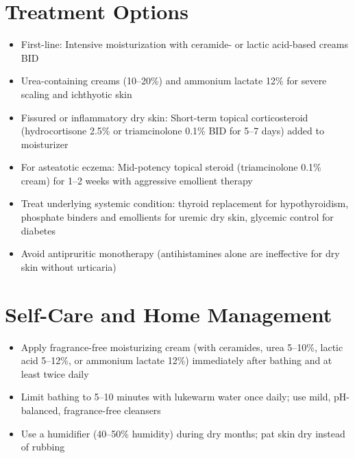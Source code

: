 \section*{Treatment Options}
\begin{itemize}
  \item First-line: Intensive moisturization with ceramide- or lactic acid-based creams BID
  \item Urea-containing creams (10--20\%) and ammonium lactate 12\% for severe scaling and ichthyotic skin
  \item Fissured or inflammatory dry skin: Short-term topical corticosteroid (hydrocortisone 2.5\% or triamcinolone 0.1\% BID for 5--7 days) added to moisturizer
  \item For asteatotic eczema: Mid-potency topical steroid (triamcinolone 0.1\% cream) for 1--2 weeks with aggressive emollient therapy
  \item Treat underlying systemic condition: thyroid replacement for hypothyroidism, phosphate binders and emollients for uremic dry skin, glycemic control for diabetes
  \item Avoid antipruritic monotherapy (antihistamines alone are ineffective for dry skin without urticaria)
\end{itemize}

\section*{Self-Care and Home Management}
\begin{itemize}
  \item Apply fragrance-free moisturizing cream (with ceramides, urea 5--10\%, lactic acid 5--12\%, or ammonium lactate 12\%) immediately after bathing and at least twice daily
  \item Limit bathing to 5--10 minutes with lukewarm water once daily; use mild, pH-balanced, fragrance-free cleansers
  \item Use a humidifier (40--50\% humidity) during dry months; pat skin dry instead of rubbing
\end{itemize}

